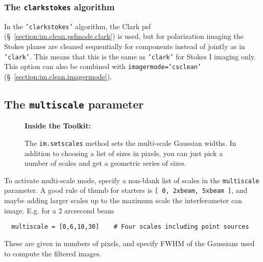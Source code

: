 \subsubsection{The {\tt clarkstokes} algorithm}
\label{section:im.clean.psfmode.clarkstokes}

In the {\tt 'clarkstokes'} algorithm, the Clark psf 
(\S~\ref{section:im.clean.psfmode.clark}) is used, but for 
polarization imaging the Stokes planes are cleaned sequentially for
components instead of jointly as in {\tt 'clark'}.  This means
that this is the same as {\tt 'clark'} for Stokes I imaging only.
This option can also be combined with {\tt imagermode='csclean'}
(\S~\ref{section:im.clean.imagermode}).

\subsection{The {\tt multiscale} parameter}
\label{section:im.clean.multiscale}


\begin{wrapfigure}{r}{2.5in}
  \begin{boxedminipage}{2.5in}
     \centerline{\bf Inside the Toolkit:}
     The {\tt im.setscales} method sets the multi-scale Gaussian
     widths.  In addition to choosing a list of sizes in pixels,
     you can just pick a number of scales and get a geometric series 
     of sizes.
  \end{boxedminipage}
\end{wrapfigure}

To activate multi-scale mode, specify a non-blank list of scales in
the {\tt multiscale} parameter.  A good rule of thumb for starters is
{\tt [ 0, 2xbeam, 5xbeam ]}, and maybe adding larger scales up to the
maximum scale the interferometer can image.  E.g. for a 2 arcsecond
beam\\ 

\small
\begin{verbatim}
  multiscale = [0,6,10,30]    # Four scales including point sources
\end{verbatim}
\normalsize
These are given in numbers of pixels, and specify FWHM of the
Gaussians used to compute the filtered images.

